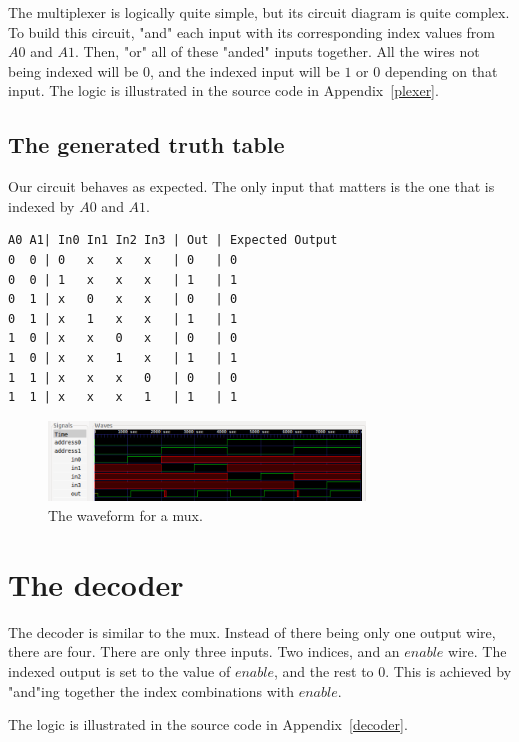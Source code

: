 \documentclass[]{article}
\begin{document}
The multiplexer is logically quite simple, but its circuit diagram is quite complex. To build this circuit, "and" each input with its corresponding index values from $A0$ and $A1$. Then, "or" all of these "anded" inputs together. All the wires not being indexed will be $0$, and the indexed input will be $1$ or $0$ depending on that input. The logic is illustrated in the source code in Appendix~\ref{plexer}.

\subsection{The generated truth table}

Our circuit behaves as expected. The only input that matters is the one that is indexed by $A0$ and $A1$.

\begin{lstlisting}
A0 A1| In0 In1 In2 In3 | Out | Expected Output
0  0 | 0   x   x   x   | 0   | 0
0  0 | 1   x   x   x   | 1   | 1
0  1 | x   0   x   x   | 0   | 0
0  1 | x   1   x   x   | 1   | 1
1  0 | x   x   0   x   | 0   | 0
1  0 | x   x   1   x   | 1   | 1
1  1 | x   x   x   0   | 0   | 0
1  1 | x   x   x   1   | 1   | 1
\end{lstlisting}

\begin{figure}[H]
	\centering
	\includegraphics[width=0.75\textwidth]{../wave_forms/multiplexer_wave.png}
				
	\caption{The waveform for a mux.}
\end{figure}

\section{The decoder}

The decoder is similar to the mux. Instead of there being only one output wire, there are four. There are only three inputs. Two indices, and an $enable$ wire. The indexed output is set to the value of $enable$, and the rest to $0$. This is achieved by "and"ing together the index combinations with $enable$.

The logic is illustrated in the source code in Appendix~\ref{decoder}.
\end{document}

